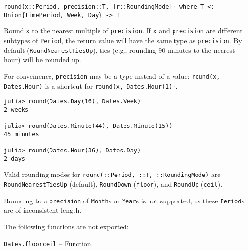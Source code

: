 \begin{adjustwidth}{2em}{0pt}


\begin{verbatim}
round(x::Period, precision::T, [r::RoundingMode]) where T <: Union{TimePeriod, Week, Day} -> T
\end{verbatim}

Round \texttt{x} to the nearest multiple of \texttt{precision}. If \texttt{x} and \texttt{precision} are different subtypes of \texttt{Period}, the return value will have the same type as \texttt{precision}. By default (\texttt{RoundNearestTiesUp}), ties (e.g., rounding 90 minutes to the nearest hour) will be rounded up.

For convenience, \texttt{precision} may be a type instead of a value: \texttt{round(x, Dates.Hour)} is a shortcut for \texttt{round(x, Dates.Hour(1))}.


\begin{verbatim}
julia> round(Dates.Day(16), Dates.Week)
2 weeks

julia> round(Dates.Minute(44), Dates.Minute(15))
45 minutes

julia> round(Dates.Hour(36), Dates.Day)
2 days
\end{verbatim}

Valid rounding modes for \texttt{round(::Period, ::T, ::RoundingMode)} are \texttt{RoundNearestTiesUp} (default), \texttt{RoundDown} (\texttt{floor}), and \texttt{RoundUp} (\texttt{ceil}).

Rounding to a \texttt{precision} of \texttt{Month}s or \texttt{Year}s is not supported, as these \texttt{Period}s are of inconsistent length.



\end{adjustwidth}

The following functions are not exported:


\hypertarget{12245544538142909757}{}
\hyperlink{12245544538142909757}{\texttt{Dates.floorceil}}  -- {Function.}


